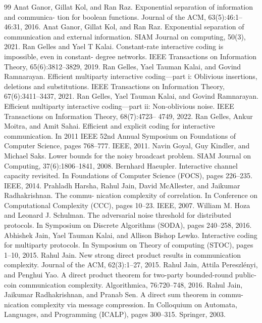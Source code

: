 \documentclass[10pt,a4paper]{article}
\begin{document}
\begin{thebibliography}{99}
 Anat Ganor, Gillat Kol, and Ran Raz. Exponential separation of information and communica- tion for boolean functions. Journal of the ACM, 63(5):46:1–46:31, 2016.
 Anat Ganor, Gillat Kol, and Ran Raz. Exponential separation of communication and external information. SIAM Journal on computing, 50(3), 2021.
 Ran Gelles and Yael T Kalai. Constant-rate interactive coding is impossible, even in constant- degree networks. IEEE Transactions on Information Theory, 65(6):3812–3829, 2019.
 Ran Gelles, Yael Tauman Kalai, and Govind Ramnarayan. Efficient multiparty interactive coding—part i: Oblivious insertions, deletions and substitutions. IEEE Transactions on Information Theory, 67(6):3411–3437, 2021.
 Ran Gelles, Yael Tauman Kalai, and Govind Ramnarayan. Efficient multiparty interactive coding—part ii: Non-oblivious noise. IEEE Transactions on Information Theory, 68(7):4723– 4749, 2022.
 Ran Gelles, Ankur Moitra, and Amit Sahai. Efficient and explicit coding for interactive communication. In 2011 IEEE 52nd Annual Symposium on Foundations of Computer Science, pages 768–777. IEEE, 2011.
 Navin Goyal, Guy Kindler, and Michael Saks. Lower bounds for the noisy broadcast problem. SIAM Journal on Computing, 37(6):1806–1841, 2008.
 Bernhard Haeupler. Interactive channel capacity revisited. In Foundations of Computer Science (FOCS), pages 226–235. IEEE, 2014.
 Prahladh Harsha, Rahul Jain, David McAllester, and Jaikumar Radhakrishnan. The commu- nication complexity of correlation. In Conference on Computational Complexity (CCC), pages 10–23. IEEE, 2007.
 William M. Hoza and Leonard J. Schulman. The adversarial noise threshold for distributed protocols. In Symposium on Discrete Algorithms (SODA), pages 240–258, 2016.
 Abhishek Jain, Yael Tauman Kalai, and Allison Bishop Lewko. Interactive coding for multiparty protocols. In Symposium on Theory of computing (STOC), pages 1–10, 2015.
 Rahul Jain. New strong direct product results in communication complexity. Journal of the ACM, 62(3):1–27, 2015.
 Rahul Jain, Attila Pereszlényi, and Penghui Yao. A direct product theorem for two-party bounded-round public-coin communication complexity. Algorithmica, 76:720–748, 2016.
 Rahul Jain, Jaikumar Radhakrishnan, and Pranab Sen. A direct sum theorem in commu- nication complexity via message compression. In Colloquium on Automata, Languages, and Programming (ICALP), pages 300–315. Springer, 2003.

\end{thebibliography}
\end{document}
